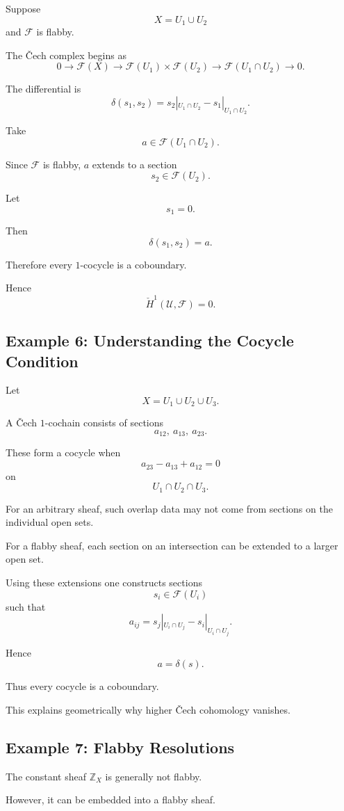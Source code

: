 \documentclass[12pt,a4paper]{article}
\theoremstyle{notespace}
\begin{document}
Suppose
\[
X=U_1\cup U_2
\]
and $\mathcal F$ is flabby.

The \v{C}ech complex begins as
\[
0
\longrightarrow
\mathcal F(X)
\longrightarrow
\mathcal F(U_1)\times\mathcal F(U_2)
\longrightarrow
\mathcal F(U_1\cap U_2)
\longrightarrow0.
\]

The differential is
\[
\delta(s_1,s_2)
=
s_2|_{U_1\cap U_2}
-
s_1|_{U_1\cap U_2}.
\]

Take
\[
a\in\mathcal F(U_1\cap U_2).
\]

Since $\mathcal F$ is flabby, $a$ extends to a section
\[
s_2\in\mathcal F(U_2).
\]

Let
\[
s_1=0.
\]

Then
\[
\delta(s_1,s_2)=a.
\]

Therefore every $1$-cocycle is a coboundary.

Hence
\[
\boxed{
	\check H^1(\mathcal U,\mathcal F)=0.
}
\]

\subsection{Example 6: Understanding the Cocycle Condition}

Let
\[
X=U_1\cup U_2\cup U_3.
\]

A \v{C}ech $1$-cochain consists of sections
\[
a_{12},\ a_{13},\ a_{23}.
\]

These form a cocycle when
\[
a_{23}
-
a_{13}
+
a_{12}
=
0
\]
on
\[
U_1\cap U_2\cap U_3.
\]

For an arbitrary sheaf, such overlap data may not come from sections on the
individual open sets.

For a flabby sheaf, each section on an intersection can be extended to a
larger open set.

Using these extensions one constructs sections
\[
s_i\in\mathcal F(U_i)
\]
such that
\[
a_{ij}
=
s_j|_{U_i\cap U_j}
-
s_i|_{U_i\cap U_j}.
\]

Hence
\[
a=\delta(s).
\]

Thus every cocycle is a coboundary.

This explains geometrically why higher \v{C}ech cohomology vanishes.

\subsection{Example 7: Flabby Resolutions}

The constant sheaf $\mathbb Z_X$ is generally not flabby.

However, it can be embedded into a flabby sheaf.
\end{document}
